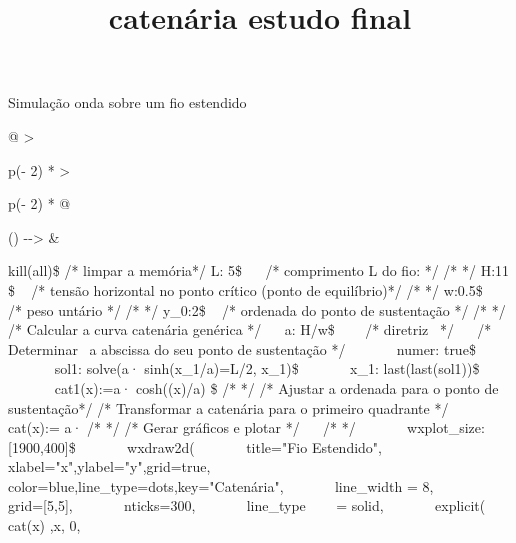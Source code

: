 \documentclass[
]{article}
\title{catenária estudo final}
\author{}
\date{}
\begin{document}
	\maketitle
	
	Simulação onda sobre um fio estendido
	
	\begin{longtable}[]{@{}
			>{\raggedright\arraybackslash}p{(\columnwidth - 2\tabcolsep) * }
			>{\raggedright\arraybackslash}p{(\columnwidth - 2\tabcolsep) * }@{}}
		\toprule()
		\endhead
		{ -\/-\textgreater{} } & \begin{minipage}[t]{\linewidth}\raggedright
			{ {kill}{(}{all}{)}{\$} {/* limpar a memória*/}{\hfill\break
				}{L}{:} {5}{\$} ~~ {/* comprimento L do fio: */}{\hfill\break
				}{/* */}{\hfill\break
				}{H}{:}{11} {\$} ~ {/* tensão horizontal no ponto crítico (ponto de
					equilíbrio)*/}{\hfill\break
				}{/* */}{\hfill\break
				}{w}{:}{0}{.}{5}{\$} ~ {/* peso untário */}{\hfill\break
				}{/* */}{\hfill\break
				}{y\_0}{:}{2}{\$} ~ {/* ordenada do ponto de sustentação
					*/}{\hfill\break
				}{/* */}{\hfill\break
				}{/* Calcular a curva catenária genérica */}{\hfill\break
				} ~~ {a}{:} {H}{/}{w}{\$} ~~~ {/* diretriz ~*/}{\hfill\break
				} ~~ {/* Determinar ~a abscissa do seu ponto de sustentação
					*/}{\hfill\break
				} ~~~~~~ {numer}{:} {true}{\$}{\hfill\break
				} ~~~~~~ {sol1}{:} {solve}{(}{a}{·}
				{sinh}{(}{x\_1}{/}{a}{)}{=}{L}{/}{2}{,} {x\_1}{)}{\$}{\hfill\break
				} ~~~~~~ {x\_1}{:} {last}{(}{last}{(}{sol1}{)}{)}{\$}{\hfill\break
				} ~~~~~~ {cat1}{(}{x}{)}{:}{=}{a}{·} {cosh}{(}{(}{x}{)}{/}{a}{)}
				{\$}{\hfill\break
				}{/* */}{\hfill\break
				}{/* Ajustar a ordenada para o ponto de sustentação*/}{\hfill\break
				}{/* Transformar a catenária para o primeiro quadrante */}{\hfill\break
				} ~~~~~~ {cat}{(}{x}{)}{:}{=} {a}{·}
				} {/* */}{\hfill\break
				}{/* Gerar gráficos e plotar */} {\hfill\break
				} ~~ {/* */}{\hfill\break
				} ~~~~~~ {wxplot\_size}{:}{{[}}{1900}{,}{400}{{]}}{\$}{\hfill\break
				} ~~~~~~ {wxdraw2d}{(}{\hfill\break
				} ~~~~~~ {title}{=}{"Fio Estendido"}{,}{\hfill\break
				} ~~~~~~
				{xlabel}{=}{"x"}{,}{ylabel}{=}{"y"}{,}{grid}{=}{true}{,}{\hfill\break
				} ~~~~~~
				{color}{=}{blue}{,}{line\_type}{=}{dots}{,}{key}{=}{"Catenária"}{,}{\hfill\break
				} ~~~~~~ {line\_width} {=} {8}{,}{\hfill\break
				} ~~~~~~ {grid}{=}{{[}}{5}{,}{5}{{]}}{,}{\hfill\break
				} ~~~~~~ {nticks}{=}{300}{,}{\hfill\break
				} ~~~~~~ {line\_type} ~~~ {=} {solid}{,}{\hfill\break
				} ~~~~~~ {explicit}{(} {cat}{(}{x}{)} {,}{x}{,} {0}{,}

\end{minipage}
\end{longtable}
\end{document}

